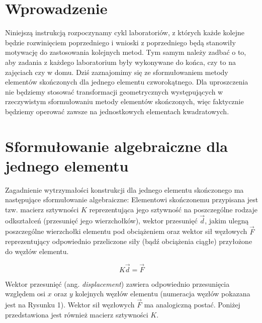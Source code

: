 \documentclass{instrukcja}
\begin{document}
\author{B. Górecki}
\materialtitle

\section*{Wprowadzenie}

Niniejszą instrukcją rozpoczynamy cykl laboratoriów, z których każde kolejne będzie rozwinięciem poprzedniego i wnioski z poprzedniego będą stanowiły motywację do zastosowania kolejnych metod. Tym samym należy zadbać o to, aby zadania z każdego laboratorium były wykonywane do końca, czy to na zajęciach czy w domu. Dziś zaznajomimy się ze sformułowaniem metody elementów skończonych dla jednego elementu czworokątnego. Dla uproszczenia nie będziemy stosować transformacji geometrycznych występujących w rzeczywistym sformułowaniu metody elementów skończonych, więc faktycznie będziemy operować zawsze na jednostkowych elementach kwadratowych.

\section{Sformułowanie algebraiczne dla jednego elementu}
Zagadnienie wytrzymałości konstrukcji dla jednego elementu skończonego ma następujące sformułowanie algebraiczne: Elementowi skończonemu przypisana jest tzw. macierz sztywności $K$ reprezentująca jego sztywność na poszczególne rodzaje odkształceń (przesunięć jego wierzchołków), wektor przesunięć $\vec d$, jakim ulegną poszczególne wierzchołki elementu pod obciążeniem oraz wektor sił węzłowych $\vec F$ reprezentujący odpowiednio przeliczone siły (bądź obciążenia ciągłe) przyłożone do węzłów elementu.

\begin{displaymath}
K \vec d = \vec F
\end{displaymath}

Wektor przesunięć (ang. {\it displacement}) zawiera odpowiednio przesunięcia względem osi $x$ oraz $y$ kolejnych węzłów elementu (numeracja węzłów pokazana jest na Rysunku 1). Wektor sił węzłowych $\vec F$ ma analogiczną postać. Poniżej przedstawiona jest również macierz sztywności $K$.
\end{document}

